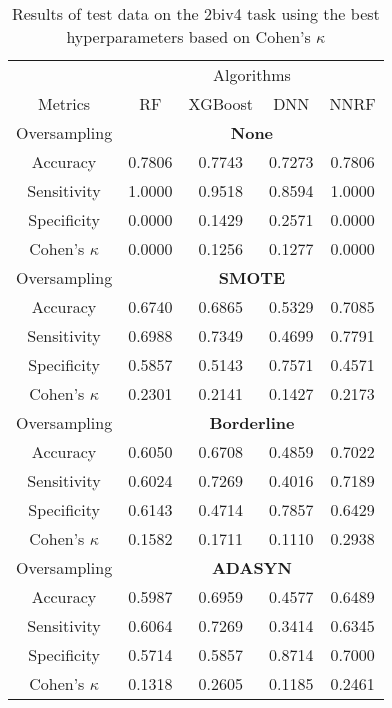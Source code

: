 \begin{table}[!htb]
\centering
\caption{Results of test data on the 2biv4 task using the best hyperparameters based on Cohen's $\kappa$}
\label{tab:2biv4_test_results}
\begin{tabular}{c | c c c c}
\hline
 & \multicolumn{4}{c}{Algorithms}\\ 
Metrics &RF & XGBoost & DNN & NNRF\\ 
\hline
Oversampling &\multicolumn{4}{|c}{\textbf{None}}\\ 
\hline
Accuracy & 0.7806 & 0.7743 & 0.7273 & 0.7806\\ 
Sensitivity & 1.0000 & 0.9518 & 0.8594 & 1.0000\\ 
Specificity & 0.0000 & 0.1429 & 0.2571 & 0.0000\\ 
Cohen's $\kappa$ & 0.0000 & 0.1256 & 0.1277 & 0.0000\\ 
\hline
Oversampling &\multicolumn{4}{|c}{\textbf{SMOTE}}\\ 
\hline
Accuracy & 0.6740 & 0.6865 & 0.5329 & 0.7085\\ 
Sensitivity & 0.6988 & 0.7349 & 0.4699 & 0.7791\\ 
Specificity & 0.5857 & 0.5143 & 0.7571 & 0.4571\\ 
Cohen's $\kappa$ & 0.2301 & 0.2141 & 0.1427 & 0.2173\\ 
\hline
Oversampling &\multicolumn{4}{|c}{\textbf{Borderline}}\\ 
\hline
Accuracy & 0.6050 & 0.6708 & 0.4859 & 0.7022\\ 
Sensitivity & 0.6024 & 0.7269 & 0.4016 & 0.7189\\ 
Specificity & 0.6143 & 0.4714 & 0.7857 & 0.6429\\ 
Cohen's $\kappa$ & 0.1582 & 0.1711 & 0.1110 & 0.2938\\ 
\hline
Oversampling &\multicolumn{4}{|c}{\textbf{ADASYN}}\\ 
\hline
Accuracy & 0.5987 & 0.6959 & 0.4577 & 0.6489\\ 
Sensitivity & 0.6064 & 0.7269 & 0.3414 & 0.6345\\ 
Specificity & 0.5714 & 0.5857 & 0.8714 & 0.7000\\ 
Cohen's $\kappa$ & 0.1318 & 0.2605 & 0.1185 & 0.2461\\ 
\hline
\end{tabular}
\end{table}

